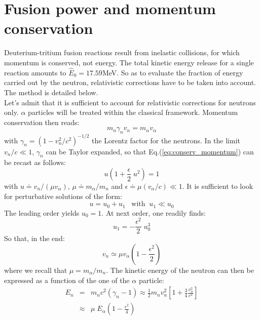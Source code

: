 \appendix

\section{Fusion power and momentum conservation}
\label{appendix:fusion_power}

Deuterium-tritium fusion reactions result from inelastic collisions, for which momentum is conserved, not energy. The total kinetic energy release for a single reaction amounts to $\hat E_0 = 17.59$MeV. So as to evaluate the fraction of energy carried out by the neutron, relativistic corrections have to be taken into account. The method is detailed below. \\

Let's admit that it is sufficient to account for relativistic corrections for neutrons only. $\alpha$ particles will be treated within the classical framework.
Momentum conservation then reads:
\begin{equation}
    m_n \gamma_n v_n = m_\alpha v_\alpha
    \label{eq:conserv_momentum}
\end{equation}
with $\gamma_n = (1-v_n^2/c^2)^{-1/2}$ the Lorentz factor for the neutrons. In the limit $v_n/c \ll1$,  $\gamma_n$ can be Taylor expanded, so that Eq.(\ref{eq:conserv_momentum}) can be recast as follows:
\begin{equation}
    u \left( 1+\frac{\epsilon}{2}\; u^2 \right) 
    = 1
    \label{eq:conserv_momentum2}
\end{equation}
with $u \doteq v_n/(\mu v_\alpha)$, $\mu \doteq m_\alpha/m_n$ and $\epsilon \doteq \mu (v_\alpha/c)\ll1$. It is sufficient to look for perturbative solutions of the form: 
$$ u = u_0 + u_1 \;\;\; \textrm{with} \;\; u_1\ll u_0 $$
The leading order yields $u_0=1$. At next order, one readily finds:
$$ u_1 = -\frac{\epsilon^2}{2} \; u_0^3 $$
So that, in the end:
\begin{equation*}
    v_n \simeq \mu v_\alpha \left( 1-\frac{\epsilon^2}{2}\right)
\end{equation*}
where we recall that $\mu=m_\alpha/m_n$.
The kinetic energy of the neutron can then be expressed as a function of the one of the $\alpha$ particle:
\begin{eqnarray*}
    E_n &=& m_nc^2(\gamma_n-1) \approx 
    \frac{1}{2} m_nv_n^2\left[ 1+ \frac{3}{4}\frac{v_n^2}{c^2}\right] \nonumber \\
    &\approx& \mu\; E_\alpha \left( 1-\frac{\epsilon^2}{4}\right)
\end{eqnarray*}

